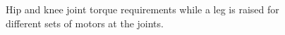 \begin{figure}[!h]
	\begin{center}
	\end{center}
  	\caption{Hip and knee joint torque requirements while a leg is raised for different sets of motors at the joints.}
	\label{fig:casestudy}
\end{figure}


